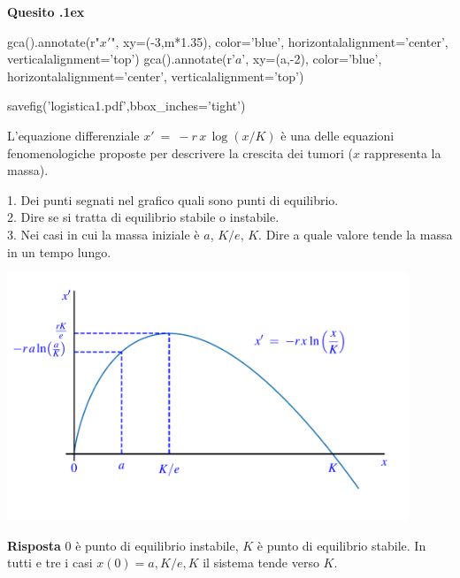 \documentclass[11pt,twoside,a4paper]{article}
\newcounter{quesito}
\newenvironment{question}{\bigskip\addtocounter{quesito}{1}\bigskip\bigskip\par\textbf{Quesito \thequesito.\kern1ex}}{\vspace{\parskip}}
\newenvironment{answer}{\par\textbf{Risposta\quad}}{\vspace{\parskip}}
\begin{document}
\begin{question}
\begin{pycode}
gca().annotate(r"$x'$", 
                    xy=(-3,m*1.35), 
                    color='blue', 
                    horizontalalignment='center',  
                    verticalalignment='top')
gca().annotate(r'$a$', 
                    xy=(a,-2), 
                    color='blue', 
                    horizontalalignment='center',  
                    verticalalignment='top')             
                    
                    
savefig('logistica1.pdf',bbox_inches='tight')
\end{pycode}

L'equazione differenziale $\displaystyle x'\ =\ - r\,x\,\log\left(x/K\right)$ è una delle equazioni fenomenologiche proposte per descrivere la crescita dei tumori ($x$ rappresenta la massa).

1. Dei punti segnati nel grafico quali sono punti di equilibrio.\\
2. Dire se si tratta di equilibrio stabile o instabile.\\
3. Nei casi in cui la massa iniziale è $a$, $K/e$, $K$. Dire a quale valore tende la massa in un tempo lungo.

\hfil\includegraphics[width=0.9\textwidth]{logistica1.pdf}

\begin{answer}
$0$ è punto di equilibrio instabile, $K$ è punto di equilibrio stabile. In tutti e tre i casi $x(0)=a, K/e, K$ il sistema tende verso $K$.


\end{answer}
\end{question}
\end{document}

